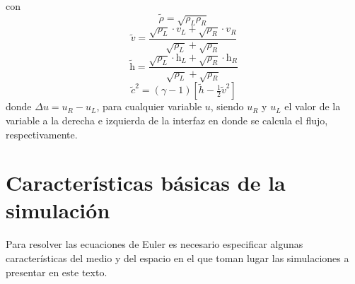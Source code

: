 con
\begin{equation}
	\tilde{\rho} = \sqrt{\rho_L \rho_R}
	\label{eq:rho-prom}
\end{equation}
\begin{equation}
	\tilde{v} = \frac{\sqrt{\rho_{L}}\cdot v_L + \sqrt{\rho_{R}}\cdot v_R}{\sqrt{\rho_{L}} + \sqrt{\rho_{R}}}
\end{equation}
\begin{equation}
	\tilde{\mathrm{h}} = \frac{\sqrt{\rho_{L}}\cdot \mathrm{h}_L + \sqrt{\rho_{R}}\cdot \mathrm{h}_R}{\sqrt{\rho_{L}} + \sqrt{\rho_{R}}}
\end{equation}
\begin{equation}
	\tilde{c}^{2} = (\gamma - 1)[\tilde{h} - \tfrac{1}{2}\tilde{v}^2]
	\label{eq:c-prom}
\end{equation}
donde $\Delta u = u_R - u_L$, para cualquier variable $u$, siendo $u_R$ y $u_L$ el valor de la variable a la derecha e izquierda de la interfaz en donde se calcula el flujo, respectivamente.
\section{Características básicas de la simulación}
Para resolver las ecuaciones de Euler es necesario especificar algunas características del medio y  del espacio en el que toman lugar las simulaciones a presentar en este texto. 

